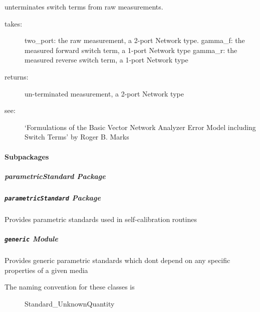 \documentclass[letterpaper,10pt,english]{sphinxmanual}
\begin{document}

\begin{fulllineitems}
\label{api/mwavepy.calibration:mwavepy.calibration.calibrationAlgorithms.unterminate_switch_terms}
unterminates switch terms from raw measurements.
\begin{description}
\item[{takes:}] \leavevmode
two\_port: the raw measurement, a 2-port Network type. 
gamma\_f: the measured forward switch term, a 1-port Network type
gamma\_r: the measured reverse switch term, a 1-port Network type

\item[{returns:}] \leavevmode
un-terminated measurement, a 2-port Network type

\item[{see:}] \leavevmode
`Formulations of the Basic Vector Network Analyzer Error
Model including Switch Terms' by Roger B. Marks

\end{description}

\end{fulllineitems}



\paragraph{Subpackages}
\label{api/mwavepy.calibration:subpackages}

\subparagraph{parametricStandard Package}
\label{api/mwavepy.calibration.parametricStandard:parametricstandard-package}\label{api/mwavepy.calibration.parametricStandard::doc}

\subparagraph{\texttt{parametricStandard} Package}
\label{api/mwavepy.calibration.parametricStandard:id1}\label{api/mwavepy.calibration.parametricStandard:module-mwavepy.calibration.parametricStandard}
Provides  parametric standards used in self-calibration routines


\subparagraph{\texttt{generic} Module}
\label{api/mwavepy.calibration.parametricStandard:module-mwavepy.calibration.parametricStandard.generic}\label{api/mwavepy.calibration.parametricStandard:generic-module}
Provides  generic parametric standards which dont depend on any 
specific properties of a given media
\begin{description}
\item[{The naming convention for these classes is }] \leavevmode
Standard\_UnknownQuantity

\end{description}
\end{document}

